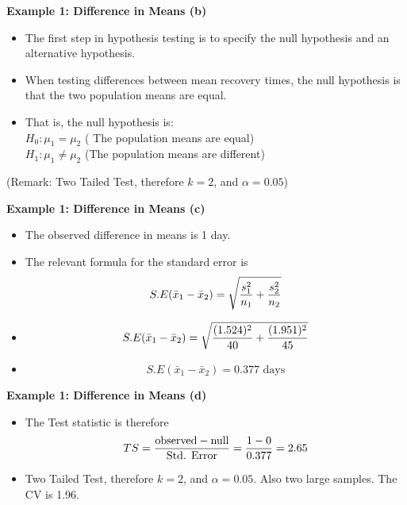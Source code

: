 \documentclass[a4]{beamer}
\begin{document}
\noindent \textbf{Example 1: Difference in Means (b) }
\begin{itemize}
\item The first step in hypothesis testing is to specify the null hypothesis and an alternative hypothesis.
\item When testing differences between mean recovery times, the null hypothesis is that the two population means are equal.
\item That is, the null hypothesis is:\\
$H_0: \mu_1 = \mu_2$ ( The population means are equal)\\
$H_1: \mu_1 \neq \mu_2$ (The population means are different)
\end{itemize}



(Remark: Two Tailed Test, therefore $k = 2$, and $\alpha = 0.05$)



\noindent \textbf{Example 1: Difference in Means (c) }
\begin{itemize}
\item The observed difference in means is 1 day.
\item The relevant formula for the standard error is
\[ S.E(\bar{x}_1 - \bar{x}_2) = \sqrt{{s^2_1\over n_1}+{s^2_2 \over n_2}} \]
\item  \[ S.E(\bar{x}_1 - \bar{x}_2) = \sqrt{{(1.524)^2 \over 40}+{(1.951)^2 \over 45}}   \]
\item  \[ S.E(\bar{x}_1 - \bar{x}_2) = 0.377\mbox{ days}\]
\end{itemize}


\noindent \textbf{Example 1: Difference in Means (d) }
\begin{itemize}
\item The Test statistic is therefore
\[ TS = {\mbox{observed} - \mbox{null} \over \mbox{Std. Error}}  = {1 - 0 \over 0.377 } = 2.65 \]
\item Two Tailed Test, therefore $k = 2$, and $\alpha = 0.05$. Also two large samples. The CV is 1.96.
\end{itemize}



\end{document}
